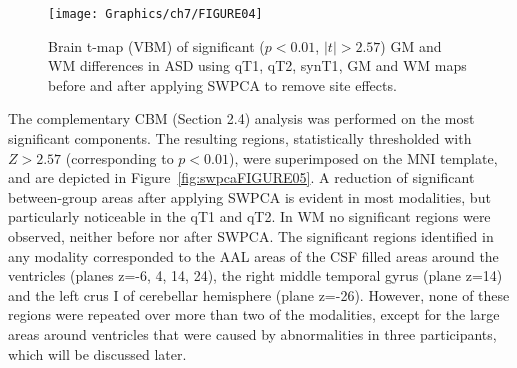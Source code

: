 \begin{figure}
	\centering
	\texttt{[image: Graphics/ch7/FIGURE04]}
	\caption[Brain t-map (\acs{VBM}) of significant ($p<0.01$, $|t|>2.57$) \acs{GM} and \acs{WM} differences in \acs{ASD} using \acs{qT1}, \acs{qT2}, \acs{synT1}, \acs{GM} and \acs{WM} maps before and after applying \acs{SWPCA} to remove site effects.]{Brain t-map (\ac{VBM}) of significant ($p<0.01$, $|t|>2.57$) \ac{GM} and \ac{WM} differences in \ac{ASD} using \ac{qT1}, \ac{qT2}, \ac{synT1}, \ac{GM} and \ac{WM} maps before and after applying \ac{SWPCA} to remove site effects.}
	\label{fig:swpcaFIGURE04}
\end{figure}

The complementary CBM (Section 2.4) analysis was performed on the most
significant components. The resulting regions, statistically
thresholded with $Z>2.57$ (corresponding to $p<0.01$), were superimposed on the
\ac{MNI} template, and are depicted in Figure~\ref{fig:swpcaFIGURE05}. A reduction of significant
between-group areas after applying \ac{SWPCA} is evident in most modalities,
but particularly noticeable in the \ac{qT1} and \ac{qT2}. In \ac{WM} no significant
regions were observed, neither before nor after \ac{SWPCA}. The significant
regions identified in any modality corresponded to the AAL areas of the
CSF filled areas around the ventricles (planes z=-6, 4, 14, 24), the
right middle temporal gyrus (plane z=14) and the left crus I of
cerebellar hemisphere (plane z=-26). However, none of these regions
were repeated over more than two of the modalities, except for the
large areas around ventricles that were caused by abnormalities in
three participants, which will be discussed later.

